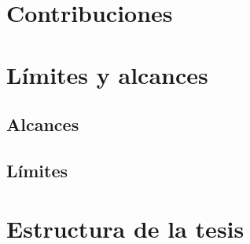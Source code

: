  \section{Contribuciones}


\section{Límites y alcances}

\subsection{Alcances}


\subsection{Límites}



\section{Estructura de la tesis}






